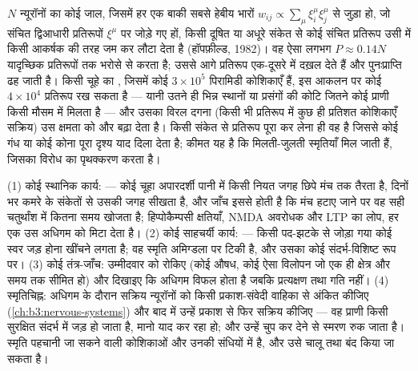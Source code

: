 \begin{proposition}\label{prop:b3:learning-memory:capacity}
$N$ न्यूरॉनों का कोई जाल, जिसमें हर एक बाकी सबसे हेबीय भारों
$w_{ij} \propto \sum_{\mu}\xi_{i}^{\mu}\xi_{j}^{\mu}$ से जुड़ा हो, जो
संचित द्विआधारी प्रतिरूपों $\xi^{\mu}$ पर जोड़े गए हों, किसी दूषित या
अधूरे संकेत से कोई संचित प्रतिरूप उसी में किसी आकर्षक की तरह जम कर
लौटा देता है (हॉपफ़ील्ड, 1982)। वह ऐसा लगभग $P
\approx 0.14N$ यादृच्छिक प्रतिरूपों तक भरोसे से करता है; उससे आगे
प्रतिरूप एक-दूसरे में दख़ल देते हैं और पुनःप्राप्ति ढह जाती है। किसी
चूहे का , जिसमें कोई $3\times 10^{5}$ पिरामिडी कोशिकाएँ हैं, इस
आकलन पर कोई $4\times 10^{4}$ प्रतिरूप रख सकता है --- यानी उतने ही भिन्न
स्थानों या प्रसंगों की कोटि जितने कोई प्राणी किसी मौसम में मिलता है ---
और उसका विरल दगना (किसी भी प्रतिरूप में कुछ ही प्रतिशत कोशिकाएँ सक्रिय)
उस क्षमता को और बढ़ा देता है। किसी संकेत से प्रतिरूप पूरा कर लेना ही
वह है जिससे कोई गंध या कोई कोना पूरा दृश्य याद दिला देता है; कीमत यह है
कि मिलती-जुलती स्मृतियाँ मिल जाती हैं, जिसका विरोध  का
पृथक्करण करता है।
\end{proposition}
\admitted

\begin{method}[स्मृति और उसके तंत्र की जाँच]\label{met:b3:learning-memory:tests}
(1) कोई स्थानिक कार्य:  --- कोई चूहा अपारदर्शी पानी
में किसी नियत जगह छिपे मंच तक तैरता है, दिनों भर कमरे के संकेतों से
उसकी जगह सीखता है, और जाँच इससे होती है कि मंच हटाए जाने पर वह सही
चतुर्थांश में कितना समय खोजता है; हिप्पोकैम्पसी क्षतियाँ, NMDA अवरोधक
और LTP का लोप, हर एक उस अधिगम को मिटा देता है। (2) कोई साहचर्यी कार्य:
 --- किसी पद-झटके से जोड़ा गया कोई स्वर जड़ होना खींचने लगता
है; वह स्मृति अमिग्डला पर टिकी है, और उसका कोई संदर्भ-विशिष्ट रूप
 पर। (3) कोई तंत्र-जाँच: उम्मीदवार को रोकिए (कोई औषध, कोई
ऐसा विलोपन जो एक ही क्षेत्र और समय तक सीमित हो) और दिखाइए कि अधिगम
विफल होता है जबकि प्रत्यक्षण तथा गति नहीं। (4) स्मृतिचिह्न: अधिगम के
दौरान सक्रिय न्यूरॉनों को किसी प्रकाश-संवेदी वाहिका से अंकित कीजिए
(\cref{ch:b3:nervous-systems}) और बाद में उन्हें प्रकाश से फिर सक्रिय
कीजिए --- वह प्राणी किसी सुरक्षित संदर्भ में जड़ हो जाता है, मानो याद
कर रहा हो; और उन्हें चुप कर देने से स्मरण रुक जाता है। स्मृति पहचानी जा
सकने वाली कोशिकाओं और उनकी संधियों में है, और उसे चालू तथा बंद किया जा
सकता है।
\end{method}


